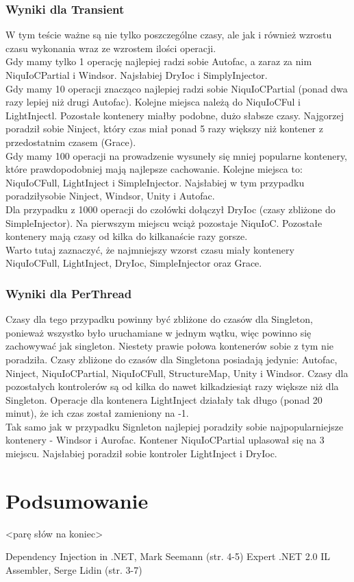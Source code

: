 \documentclass[12pt]{article}
\begin{document}
\subsubsection{Wyniki dla Transient}
W tym teście ważne są nie tylko poszczególne czasy, ale jak i również wzrostu czasu wykonania wraz ze wzrostem ilości operacji.\\
Gdy mamy tylko 1 operację najlepiej radzi sobie Autofac, a zaraz za nim NiquIoCPartial i Windsor. Najsłabiej DryIoc i SimplyInjector.\\
Gdy mamy 10 operacji znacząco najlepiej radzi sobie NiquIoCPartial (ponad dwa razy lepiej niż drugi Autofac). Kolejne miejsca należą do NiquIoCFul i LightInjectl. Pozostałe kontenery miałby podobne, dużo słabsze czasy. Najgorzej poradził sobie Ninject, który czas miał ponad 5 razy większy niż kontener z przedostatnim czasem (Grace).\\
Gdy mamy 100 operacji na prowadzenie wysuneły się mniej popularne kontenery, które prawdopodobniej mają najlepsze cachowanie. Kolejne miejsca to: NiquIoCFull, LightInject i SimpleInjector. Najsłabiej w tym przypadku poradziłysobie Ninject, Windsor, Unity i Autofac.\\
Dla przypadku z 1000 operacji do czołówki dołączył DryIoc (czasy zbliżone do SimpleInjector). Na pierwszym miejscu wciąż pozostaje NiquIoC. Pozostałe kontenery mają czasy od kilka do kilkanaście razy gorsze.\\
Warto tutaj zaznaczyć, że najmniejszy wzorst czasu miały kontenery NiquIoCFull, LightInject, DryIoc, SimpleInjector oraz Grace.

\subsubsection{Wyniki dla PerThread}
Czasy dla tego przypadku powinny być zbliżone do czasów dla Singleton, ponieważ wszystko było uruchamiane w jednym wątku, więc powinno się zachowywać jak singleton. Niestety prawie połowa kontenerów sobie z tym nie poradziła. Czasy zbliżone do czasów dla Singletona posiadają jedynie: Autofac, Ninject, NiquIoCPartial, NiquIoCFull, StructureMap, Unity i Windsor. Czasy dla pozostałych kontrolerów są od kilka do nawet kilkadziesiąt razy większe niż dla Singleton. Operacje dla kontenera LightInject działały tak długo (ponad 20 minut), że ich czas został zamieniony na -1.\\
Tak samo jak w przypadku Signleton najlepiej poradziły sobie najpopularniejsze kontenery - Windsor i Aurofac. Kontener NiquIoCPartial uplasował się na 3 miejscu. Najsłabiej poradził sobie kontroler LightInject i DryIoc.



\clearpage

\section{Podsumowanie}
<parę słów na koniec>

\newpage
\begin{thebibliography}{authordate1}
 Dependency Injection in .NET, Mark Seemann (str. 4-5)
 Expert .NET 2.0 IL Assembler, Serge Lidin (str. 3-7)
\end{thebibliography}
\end{document}
